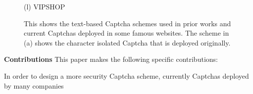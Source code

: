 \begin{figure}[!t]
{\begin{minipage}[t]{0.20\textwidth}
                    \center (l) VIPSHOP
                \end{minipage}
            }
            \caption{This shows the text-based Captcha schemes used in prior works and current Captchas deployed in some famous websites. The scheme in (a) shows the character isolated Captcha that is deployed originally.}
            \label{fig:text-based captchas}
        \end{figure}

\textbf{Contributions} This paper makes the following specific contributions:

In order to design a more security Captcha scheme, currently Captchas deployed by many companies 